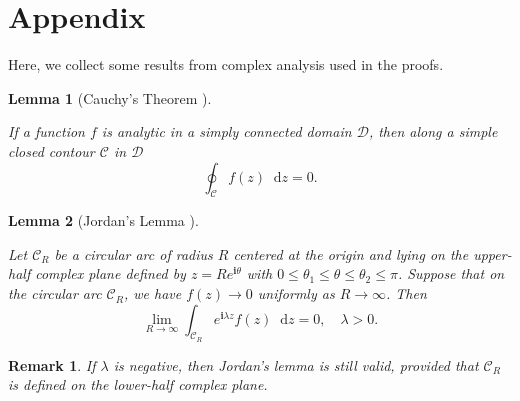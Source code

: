 \documentclass[journal,twoside,web]{ieeecolor}
\newtheorem{lemma}{Lemma}
\newtheorem{remark}{Remark}
\newcommand{\D}{\mathcal{D}}
\newcommand{\C}{\mathcal{C}}
\newcommand{\im}{\mathbf{i}}
\newcommand*\diff{\mathop{}\!\mathrm{d}}
\begin{document}
{}





\section*{Appendix}
Here, we collect some results from complex analysis used in the proofs.

\begin{lemma}[{Cauchy's Theorem \cite[Theorem 2.5.2]{ablowitz2003complex}}]\label{lemm:cauchy}
	
	If a function $f$ is analytic in a simply connected domain $\D$, then along a simple closed contour $\C$ in $\D$
	\begin{equation*}
		\oint_{\C}f(z)\diff z=0.
	\end{equation*}
\end{lemma}
\begin{lemma}[{Jordan's Lemma \cite[Lemma 4.2.2]{ablowitz2003complex}}]\label{lemm:jordan}
	
	Let $\C_R$ be a circular arc of radius $R$ centered at the origin and lying on the upper-half complex plane defined by $z=Re^{\im\theta}$ with $0\leq\theta_1\leq\theta\leq\theta_2\leq\pi$.	
	Suppose that on the circular arc $\C_R$, we have $f(z)\to0$ uniformly as $R\to\infty$. Then
	\begin{equation*}
		\lim_{R\to\infty}\int_{\C_R} e^{\im\lambda z}f(z)\diff z=0,\quad \lambda>0.
	\end{equation*}
\end{lemma}

\begin{remark}
	If $\lambda$ is negative, then Jordan's lemma is still valid, provided that $\C_R$ is defined on the lower-half complex plane.
\end{remark}
\end{document}
